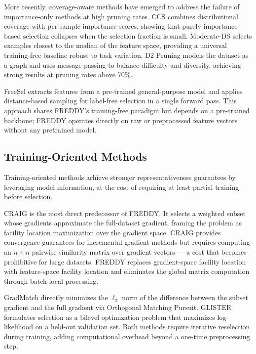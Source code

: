 \documentclass{article}
\begin{document}
More recently, coverage-aware methods have emerged to address the failure of importance-only methods at high pruning rates.
CCS \cite{Zheng2023CCS} combines distributional coverage with per-sample importance scores, showing that purely importance-based selection collapses when the selection fraction is small.
Moderate-DS \cite{Xia2023Moderate} selects examples closest to the median of the feature space, providing a universal training-free baseline robust to task variation.
D2 Pruning \cite{Maharana2024D2} models the dataset as a graph and uses message passing to balance difficulty and diversity, achieving strong results at pruning rates above 70\%.

FreeSel \cite{Xie2023FreeSel} extracts features from a pre-trained general-purpose model and applies distance-based sampling for label-free selection in a single forward pass.
This approach shares FREDDY's training-free paradigm but depends on a pre-trained backbone; FREDDY operates directly on raw or preprocessed feature vectors without any pretrained model.

\subsection{Training-Oriented Methods}

Training-oriented methods achieve stronger representativeness guarantees by leveraging model information, at the cost of requiring at least partial training before selection.

CRAIG \cite{Mirzasoleiman2020Coresets} is the most direct predecessor of FREDDY.
It selects a weighted subset whose gradients approximate the full-dataset gradient, framing the problem as facility location maximization over the gradient space.
CRAIG provides convergence guarantees for incremental gradient methods but requires computing an $n \times n$ pairwise similarity matrix over gradient vectors — a cost that becomes prohibitive for large datasets.
FREDDY replaces gradient-space facility location with feature-space facility location and eliminates the global matrix computation through batch-local processing.

GradMatch \cite{Killamsetty2021GradMatch} directly minimizes the $\ell_2$ norm of the difference between the subset gradient and the full gradient via Orthogonal Matching Pursuit.
GLISTER \cite{killamsetty2021glister} formulates selection as a bilevel optimization problem that maximizes log-likelihood on a held-out validation set.
Both methods require iterative reselection during training, adding computational overhead beyond a one-time preprocessing step.
\end{document}
